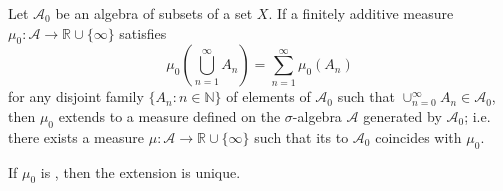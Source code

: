 \documentclass[12pt]{article}
\newcommand{\R}{\mathbb{R}}
\newcommand{\N}{\mathbb{N}}
\begin{document}
Let $\mathscr{A}_0$ be an algebra of subsets of a set $X$. If a finitely additive measure $\mu_0\colon \mathscr{A}\to\R\cup \{\infty\}$ satisfies
$$\mu_0(\bigcup_{n=1}^\infty A_n) = \sum_{n=1}^\infty \mu_0(A_n)$$
for any disjoint family $\{A_n:n\in \N\}$ of elements of $\mathscr{A}_0$ such that $\cup_{n=0}^\infty A_n\in \mathscr{A}_0$, then $\mu_0$ 
extends to a measure defined on the $\sigma$-algebra $\mathscr{A}$ generated by $\mathscr{A}_0$; i.e. there exists a measure $\mu\colon\mathscr{A}\to \R\cup\{\infty\}$ such that its  to $\mathscr{A}_0$ coincides with $\mu_0$.

If $\mu_0$ is , then the extension is unique.
\end{document}
